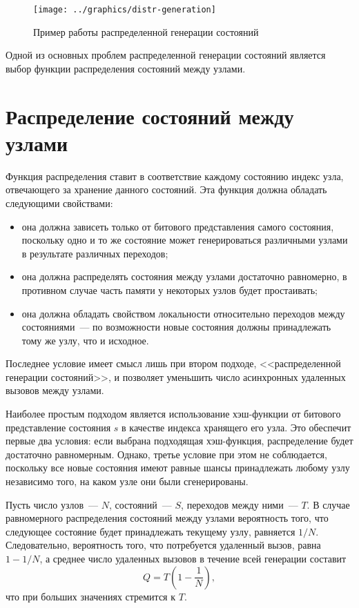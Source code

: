 \documentclass[12pt,a4paper,fleqn]{article}
\begin{document}
\begin{figure}[ht]
  \centering
  \texttt{[image: ../graphics/distr-generation]}
  \caption{Пример работы распределенной генерации состояний}
  \label{fig:distr-generation}
\end{figure}

Одной из основных проблем распределенной генерации состояний является выбор функции распределения состояний между
узлами.

\section{Распределение состояний между узлами}
\label{sec:state-partition}

Функция распределения ставит в соответствие каждому состоянию индекс узла, отвечающего за хранение данного
состояний. Эта функция должна обладать следующими свойствами:

\begin{itemize}
\item она должна зависеть только от битового представления самого состояния, поскольку одно и то же состояние
  может генерироваться различными узлами в результате различных переходов;

\item она должна распределять состояния между узлами достаточно равномерно, в противном случае часть памяти у некоторых
  узлов будет простаивать;

\item она должна обладать свойством локальности относительно переходов между состояниями~--- по возможности новые
  состояния должны принадлежать тому же узлу, что и исходное.
\end{itemize}

Последнее условие имеет смысл лишь при втором подходе, <<распределенной генерации состояний>>, и позволяет уменьшить число
асинхронных удаленных вызовов между узлами.

Наиболее простым подходом является использование хэш-функции от битового представление состояния $s$ в качестве индекса
хранящего его узла. Это обеспечит первые два условия: если выбрана подходящая хэш-функция, распределение будет
достаточно равномерным. Однако, третье условие при этом не соблюдается, поскольку все новые состояния имеют равные шансы
принадлежать любому узлу независимо того, на каком узле они были сгенерированы.

Пусть число узлов~--- $N$, состояний~--- $S$, переходов между ними~--- $T$. В случае равномерного распределения
состояний между узлами вероятность того, что следующее состояние будет принадлежать текущему узлу, равняется
$1/N$. Следовательно, вероятность того, что потребуется удаленный вызов, равна $1 - 1/N$, а среднее число удаленных
вызовов в течение всей генерации составит
\begin{equation}
  \label{eq:rpc-partfull}
  Q = T (1 - \frac{1}{N}),
\end{equation}
что при больших значениях стремится к $T$.
\end{document}
